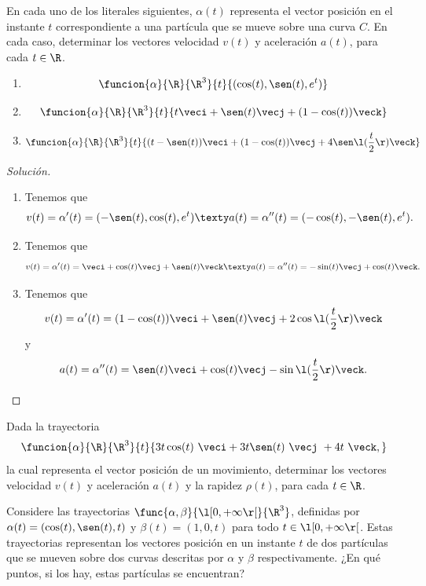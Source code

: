 \documentclass[a4,11pt]{aleph-notas}
\begin{document}
\encabezado

\begin{ejer}
En cada uno de los literales siguientes, $\alpha(t)$ representa el vector posición en el instante $t$ correspondiente a una partícula que se mueve sobre una curva $C$. En cada caso, determinar los vectores velocidad $v(t)$ y aceleración $a(t)$, para cada $t\in\R$.	
    \begin{enumerate}
    \item 
        \[
            \funcion{\alpha}{\R}{\R^3}{t}{(\cos(t),\sen(t),e^t)}
        \]
    \item
        \[
            \funcion{\alpha}{\R}{\R^3}{t}{t\veci+\sen(t)\vecj+(1-\cos(t))\veck}
        \]
    \item
    	\[
        	\funcion{\alpha}{\R}{\R^3}{t}{(t-\sen(t))\veci+(1-\cos(t))\vecj+4\sen\l(\frac{t}{2}\r)\veck}
       	\]
    \end{enumerate}
\end{ejer}

\begin{proof}[Solución]
\begin{enumerate}
    \item
        Tenemos que
        \[
            v(t)=\alpha'(t)=(-\sen(t),\cos(t),e^t)
            \texty
            a(t)=\alpha''(t)=(-\cos(t),-\sen(t),e^t).
        \]
    \item
        Tenemos que
        \[
            v(t)=\alpha'(t)=\veci +\cos(t)\vecj +\sen(t)\veck
            \texty
            a(t)=\alpha''(t)= -\sin(t)\vecj +\cos(t)\veck.
        \]
    \item
    	Tenemos que
        \[
            v(t)=\alpha'(t)=(1-\cos(t))\veci +\sen(t)\vecj +2\cos\l(\frac{t}{2}\r)\veck
        \]
        y
        \[
            a(t)=\alpha''(t)= \sen(t)\veci +\cos(t)\vecj -\sin\l(\frac{t}{2}\r)\veck. \qedhere
        \]
    \end{enumerate}
\end{proof}

\begin{ejer}
Dada la trayectoria
    \[
    	\funcion{\alpha}{\R}{\R^3}{t}{3t\cos(t) \ \veci+3t\sen(t)\   \vecj\ + 4t\ \veck,}
    \]
    la cual representa el vector posición de un movimiento, determinar los vectores velocidad $v(t)$ y aceleración $a(t)$ y la rapidez $\rho(t)$, para cada $t\in\R$.
\end{ejer}

\begin{ejer}
Considere las trayectorias $\func{\alpha,\beta}{\l[0,+\infty\r[}{\R^3}$, definidas por $\alpha(t)=(\cos(t),\sen(t),t)$ y $\beta(t)=(1,0,t)$ para todo $t\in\l[0,+\infty\r[$. Estas trayectorias representan los vectores posición en un instante $t$ de dos partículas que se mueven sobre dos curvas descritas por $\alpha$ y $\beta$ respectivamente. ¿En qué puntos, si los hay, estas partículas se encuentran?
\end{ejer}
\end{document}
